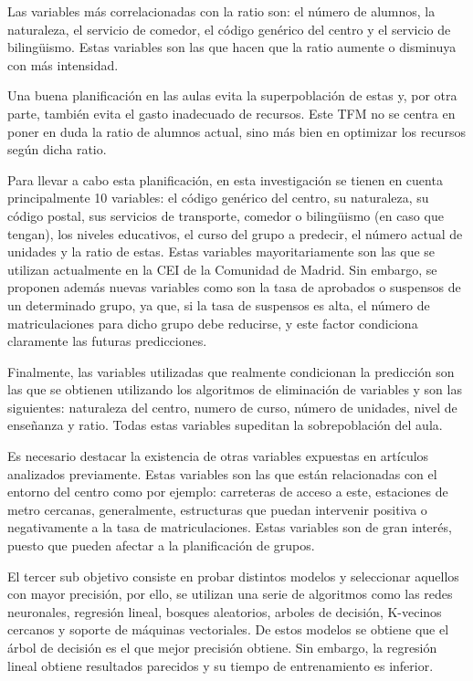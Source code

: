 Las variables más correlacionadas con la ratio son: el número de alumnos, la naturaleza, el servicio de comedor, el código genérico del centro y el servicio de bilingüismo. Estas variables son las que hacen que la ratio aumente o disminuya con más intensidad.

Una buena planificación en las aulas evita la superpoblación de estas y, por otra parte, también evita el gasto inadecuado de recursos. Este TFM no se centra en poner en duda la ratio de alumnos actual, sino más bien en optimizar los recursos según dicha ratio.

Para llevar a cabo esta planificación, en esta investigación se tienen en cuenta principalmente 10 variables: el código genérico del centro, su naturaleza, su código postal, sus servicios de transporte, comedor o bilingüismo (en caso que tengan), los niveles educativos, el curso del grupo a predecir, el número actual de unidades y la ratio de estas. Estas variables mayoritariamente son las que se utilizan actualmente en la CEI de la Comunidad de Madrid. Sin embargo, se proponen además nuevas variables como son la tasa de aprobados o suspensos de un determinado grupo, ya que, si la tasa de suspensos es alta, el número de matriculaciones para dicho grupo debe reducirse, y este factor condiciona claramente las futuras predicciones.

Finalmente, las variables utilizadas que realmente condicionan la predicción son las que se obtienen utilizando los algoritmos de eliminación de variables y son las siguientes: naturaleza del centro, numero de curso, número de unidades, nivel de enseñanza y ratio. Todas estas variables supeditan la sobrepoblación del aula.

Es necesario destacar la existencia de otras variables expuestas en artículos analizados previamente. Estas variables son las que están relacionadas con el entorno del centro como por ejemplo: carreteras de acceso a este, estaciones de metro cercanas, generalmente, estructuras que puedan intervenir positiva o negativamente a la tasa de matriculaciones. Estas variables son de gran interés, puesto que pueden afectar a la planificación de grupos.

El tercer sub objetivo consiste en probar distintos modelos y seleccionar aquellos con mayor precisión, por ello, se utilizan una serie de algoritmos como las redes neuronales, regresión lineal, bosques aleatorios, arboles de decisión, K-vecinos cercanos y soporte de máquinas vectoriales. De estos modelos se obtiene que el árbol de decisión es el que mejor precisión obtiene. Sin embargo, la regresión lineal obtiene resultados parecidos y su tiempo de entrenamiento es inferior.

